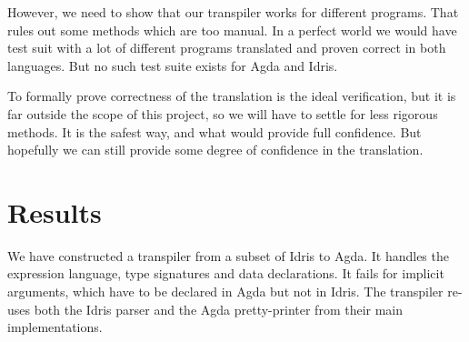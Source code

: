 \documentclass[parskip=half]{scrartcl}
\begin{document}

However, we need to show that our transpiler works for different programs.
That rules out some methods which are too manual.  In a perfect world we would
have test suit with a lot of different programs translated and proven correct in
both languages. But no such test suite exists for Agda and Idris.


To formally prove correctness of the translation is the ideal verification, but
it is far outside the scope of this project, so we will have to settle for less
rigorous methods. It is the safest way, and what would provide full confidence.
But hopefully we can still provide some degree of confidence in the
translation.


\section{Results}

%



We have constructed a transpiler from a subset of Idris to Agda. It handles the
expression language, type signatures and data declarations.  It fails for
implicit arguments, which have to be declared in Agda but not in Idris. The
transpiler re-uses both the Idris parser and the Agda pretty-printer from their
main implementations.
\end{document}
